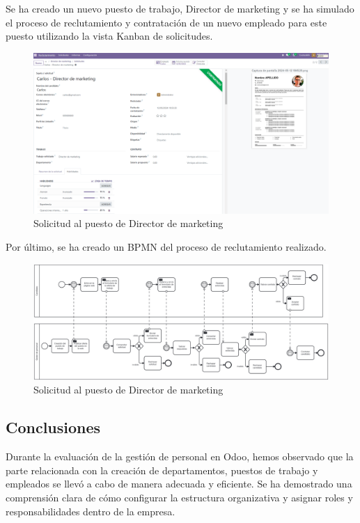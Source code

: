 Se ha creado un nuevo puesto de trabajo, Director de marketing y se ha simulado el proceso de reclutamiento y contratación de un nuevo empleado para este puesto utilizando la vista Kanban de solicitudes.
\begin{figure}[h]
    \centering
    \includegraphics[width=1\linewidth]{fotosGestPers/reclutamiento.png}
    \caption{Solicitud al puesto de Director de marketing}
    \label{fig:enter-label}
\end{figure}
Por último, se ha creado un BPMN del proceso de reclutamiento realizado.
\begin{figure}[h]
    \centering
    \includegraphics[width=1\linewidth]{bpmn/gestPers.png}
    \caption{Solicitud al puesto de Director de marketing}
    \label{fig:enter-label}
\end{figure}
\subsection{Conclusiones}
Durante la evaluación de la gestión de personal en Odoo, hemos observado que la parte relacionada con la creación de departamentos, puestos de trabajo y empleados se llevó a cabo de manera adecuada y eficiente. Se ha demostrado una comprensión clara de cómo configurar la estructura organizativa y asignar roles y responsabilidades dentro de la empresa. 
